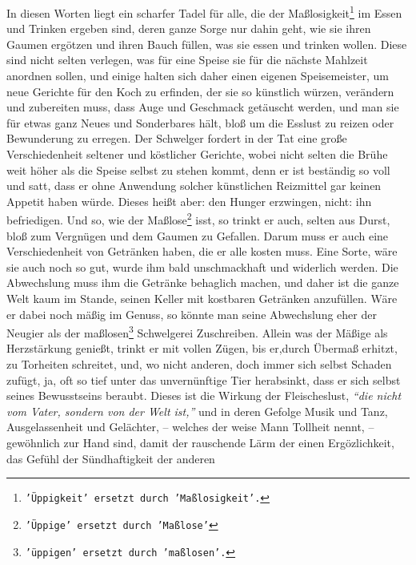 \medskip

In diesen Worten liegt ein scharfer Tadel für alle, die der
Maßlosigkeit\footnote{\texttt{'Üppigkeit' ersetzt durch 'Maßlosigkeit'.}} im Essen
und Trinken ergeben sind, deren ganze Sorge nur dahin geht, wie sie ihren
Gaumen ergötzen und ihren Bauch füllen, was sie essen und trinken wollen. Diese
sind nicht selten verlegen, was für eine Speise sie für die nächste Mahlzeit
anordnen sollen, und einige halten sich daher einen eigenen
Speisemeister, um
neue Gerichte für den Koch zu erfinden,
der sie so künstlich würzen, verändern
und zubereiten muss, dass Auge und Geschmack getäuscht werden, und man sie für
etwas ganz Neues und Sonderbares hält, bloß um die Esslust zu reizen oder
Bewunderung zu erregen. Der Schwelger fordert in der
Tat eine große
Verschiedenheit seltener und köstlicher Gerichte, wobei nicht selten die Brühe
weit höher als die Speise selbst zu stehen kommt, denn er ist beständig so voll
und satt, dass er ohne Anwendung solcher künstlichen
Reizmittel gar keinen
Appetit haben würde. Dieses heißt aber: den Hunger erzwingen, nicht: ihn
befriedigen. Und so, wie der Maßlose\footnote{\texttt{'Üppige' ersetzt durch
'Maßlose'}} isst,
so trinkt er auch, selten aus Durst,
bloß zum Vergnügen und dem Gaumen zu Gefallen. Darum muss er
auch eine
Verschiedenheit von Getränken haben, die er alle kosten
muss. Eine Sorte, wäre
sie auch noch so gut, wurde ihm bald unschmackhaft und widerlich werden. Die
Abwechslung muss ihm die Getränke behaglich machen, und daher ist die ganze Welt
kaum im Stande, seinen Keller mit kostbaren Getränken anzufüllen. Wäre er dabei
noch mäßig im Genuss, so könnte man seine Abwechslung eher der Neugier als der
maßlosen\footnote{\texttt{'üppigen' ersetzt durch 'maßlosen'.}} Schwelgerei
Zuschreiben. Allein was
der Mäßige als Herzstärkung
genießt, trinkt er mit vollen Zügen, bis er,durch
Übermaß erhitzt, zu
Torheiten schreitet, und, wo nicht anderen, doch immer sich selbst Schaden
zufügt, ja, oft so tief unter das unvernünftige Tier herabsinkt, dass er sich
selbst seines Bewusstseins beraubt. Dieses ist die Wirkung der Fleischeslust,
\textit{"`die nicht vom Vater, sondern von der Welt ist,"'} und in deren Gefolge
Musik
und Tanz, Ausgelassenheit und Gelächter, -- welches der weise Mann
Tollheit
nennt, -- gewöhnlich zur Hand sind, damit der rauschende Lärm der einen
Ergözlichkeit, das Gefühl der Sündhaftigkeit der anderen
